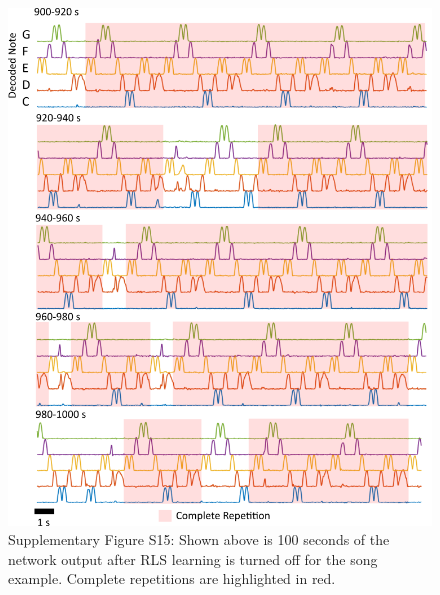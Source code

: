 \documentclass[11pt]{article} %
\begin{document}




\begin{figure}[htp!]
\centering 
\includegraphics[scale=0.85]{FFIGS16}
\caption*{Supplementary Figure S15:   Shown above is 100 seconds of the network output after RLS learning is turned off for the song example.  Complete repetitions are highlighted in red. }  
\end{figure}
\end{document}
